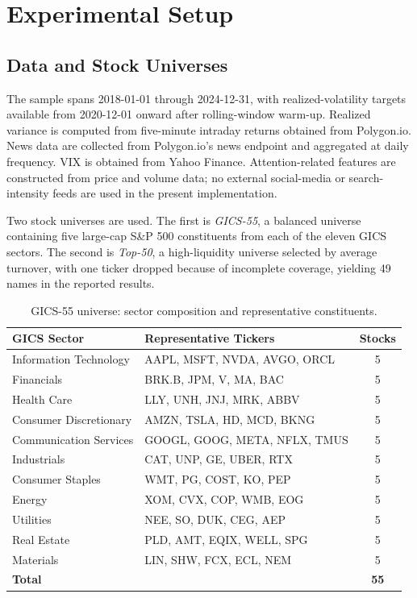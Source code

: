 \documentclass[review]{elsarticle}
\begin{document}
\section{Experimental Setup}\label{experimental-setup}

\subsection{Data and Stock Universes}\label{data-and-instruments}

The sample spans 2018-01-01 through 2024-12-31, with realized-volatility targets available from 2020-12-01 onward after rolling-window warm-up. Realized variance is computed from five-minute intraday returns obtained from Polygon.io. News data are collected from Polygon.io's news endpoint and aggregated at daily frequency. VIX is obtained from Yahoo Finance. Attention-related features are constructed from price and volume data; no external social-media or search-intensity feeds are used in the present implementation.

Two stock universes are used. The first is \emph{GICS-55}, a balanced universe containing five large-cap S\&P 500 constituents from each of the eleven GICS sectors. The second is \emph{Top-50}, a high-liquidity universe selected by average turnover, with one ticker dropped because of incomplete coverage, yielding 49 names in the reported results.

\begin{table}[t]
\centering
\caption{GICS-55 universe: sector composition and representative constituents.}
\label{tab:gics-composition}
\begin{tabular}{llc}
\hline
GICS Sector & Representative Tickers & Stocks \\\hline
Information Technology & AAPL, MSFT, NVDA, AVGO, ORCL & 5 \\
Financials & BRK.B, JPM, V, MA, BAC & 5 \\
Health Care & LLY, UNH, JNJ, MRK, ABBV & 5 \\
Consumer Discretionary & AMZN, TSLA, HD, MCD, BKNG & 5 \\
Communication Services & GOOGL, GOOG, META, NFLX, TMUS & 5 \\
Industrials & CAT, UNP, GE, UBER, RTX & 5 \\
Consumer Staples & WMT, PG, COST, KO, PEP & 5 \\
Energy & XOM, CVX, COP, WMB, EOG & 5 \\
Utilities & NEE, SO, DUK, CEG, AEP & 5 \\
Real Estate & PLD, AMT, EQIX, WELL, SPG & 5 \\
Materials & LIN, SHW, FCX, ECL, NEM & 5 \\\hline
\multicolumn{2}{l}{\textbf{Total}} & \textbf{55} \\\hline
\end{tabular}
\end{table}
\end{document}
